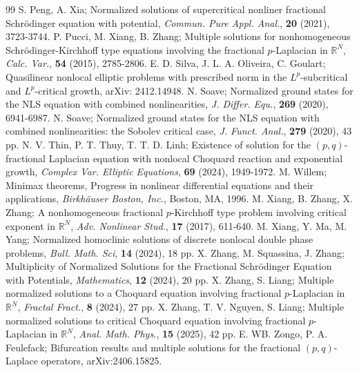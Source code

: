 \documentclass[10pt,a4paper]{amsart}
\numberwithin{equation}{section}
\begin{document}
\begin{thebibliography}{99}
 S. Peng, A. Xia; Normalized solutions of supercritical nonliner fractional Schr\"{o}dinger equation with potential, \emph{Commun. Pure Appl. Anal.}, \textbf{20} (2021), 3723-3744.
 P. Pucci, M. Xiang, B. Zhang; Multiple solutions for nonhomogeneous Schr\"{o}dinger-Kirchhoff type equations involving the fractional $p$-Laplacian in $\mathbb{R}^N$, \emph{Calc. Var.}, \textbf{54} (2015), 2785-2806.
 E. D. Silva, J. L. A. Oliveira, C. Goulart; Quasilinear nonlocal elliptic problems with prescribed norm in the $ L^{p}$-subcritical and $ L^{p}$-critical growth, {arXiv: 2412.14948}.
 N. Soave; Normalized ground states for the NLS equation with combined nonlinearities, \emph{J. Differ. Equ.}, \textbf{269} (2020), 6941-6987.
 N. Soave; Normalized ground states for the NLS equation with combined nonlinearities: the Sobolev critical case, \emph{J. Funct. Anal.}, \textbf{279} (2020), 43 pp.
 N. V. Thin, P. T. Thuy, T. T. D. Linh; Existence of solution for the $(p,q)$-fractional Laplacian equation with nonlocal Choquard reaction and exponential growth, \emph{Complex Var. Elliptic Equations}, \textbf{69} (2024), 1949-1972.
 M. Willem; Minimax theorems, Progress in nonlinear differential equations and their applications, \emph{Birkh\"{a}user Boston, Inc.}, Boston, MA, 1996.
 M. Xiang, B. Zhang, X. Zhang; A nonhomogeneous fractional $p$-Kirchhoff type problem involving critical exponent in $\mathbb{R}^N$, \emph{Adv. Nonlinear Stud.}, \textbf{17} (2017), 611-640.
 M. Xiang, Y. Ma, M. Yang; Normalized homoclinic solutions of discrete nonlocal double phase problems, \emph{Bull. Math. Sci}, \textbf{14} (2024), 18 pp.
 X. Zhang, M. Squassina, J. Zhang; Multiplicity of Normalized Solutions for the Fractional Schr\"{o}dinger Equation with Potentials, \emph{Mathematics}, \textbf{12} (2024), 20 pp.
 X. Zhang, S. Liang; Multiple normalized solutions to a Choquard equation involving fractional $p$-Laplacian in $\mathbb{R}^N$, \emph{Fractal Fract.}, \textbf{8} (2024), 27 pp.
 X. Zhang, T. V. Nguyen,  S. Liang; Multiple normalized solutions to critical Choquard equation involving fractional $p$-Laplacian in $\mathbb{R}^N$, \emph{Anal. Math. Phys.}, \textbf{15} (2025), 42 pp.
 E. WB. Zongo, P. A. Feulefack; Bifurcation results and multiple solutions for the fractional $(p, q) $-Laplace operators, {arXiv:2406.15825}.
\end{thebibliography}
\end{document}
